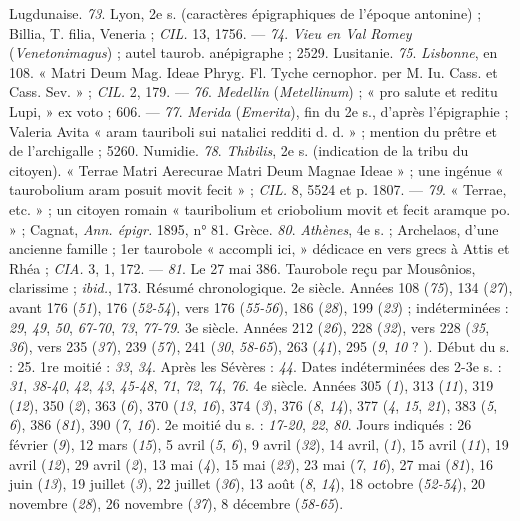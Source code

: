 \documentclass[a4paper, 11pt, oneside, polutonikogreek, french]{article}
\begin{document}
Lugdunaise. \emph{73}. Lyon, 2e s. (caractères épigraphiques de l'époque antonine) ; Billia, T. filia, Veneria ; \emph{CIL.} 13, 1756. --- \emph{74}. \emph{Vieu en Val Romey} (\emph{Venetonimagus}) ; autel taurob. anépigraphe ; 2529.  
Lusitanie. \emph{75}. \emph{Lisbonne}, en 108. « Matri Deum Mag. Ideae Phryg. Fl. Tyche cernophor. per M. Iu. Cass. et Cass. Sev. » ; \emph{CIL.} 2, 179. --- \emph{76}. \emph{Medellin} (\emph{Metellinum}) ; « pro salute et reditu Lupi, » ex voto ; 606. --- \emph{77}. \emph{Merida} (\emph{Emerita}), fin du 2e s., d'après l'épigraphie ; Valeria Avita « aram tauriboli sui natalici redditi d. d. » ; mention du prêtre et de l'archigalle ; 5260.  
Numidie. \emph{78}. \emph{Thibilis}, 2e s. (indication de la tribu du citoyen). « Terrae Matri Aerecurae Matri Deum Magnae Ideae » ; une ingénue « taurobolium aram posuit movit fecit » ; \emph{CIL.} 8, 5524 et p. 1807. --- \emph{79}. « Terrae, etc. » ; un citoyen romain « tauribolium et criobolium movit et fecit aramque po. » ; Cagnat, \emph{Ann. épigr.} 1895, n° 81.  
Grèce. \emph{80}. \emph{Athènes}, 4e s. ; Archelaos, d'une ancienne famille ; 1er taurobole « accompli ici, » dédicace en vers grecs à Attis et Rhéa ; \emph{CIA.} 3, 1, 172. --- \emph{81}. Le 27 mai 386. Taurobole reçu par Mousônios, clarissime ; \emph{ibid.}, 173.  
Résumé chronologique. 2e siècle. Années 108 (\emph{75}), 134 (\emph{27}), avant 176 (\emph{51}), 176 (\emph{52-54}), vers 176 (\emph{55-56}), 186 (\emph{28}), 199 (\emph{23}) ; indéterminées : \emph{29}, \emph{49}, \emph{50}, \emph{67-70}, \emph{73}, \emph{77-79}.  
3e siècle. Années 212 (\emph{26}), 228 (\emph{32}), vers 228 (\emph{35}, \emph{36}), vers 235 (\emph{37}), 239 (\emph{57}), 241 (\emph{30}, \emph{58-65}), 263 (\emph{41}), 295 (\emph{9}, \emph{10} ? ). Début du s. : 25. 1re moitié : \emph{33}, \emph{34}. Après les Sévères : \emph{44}.  
Dates indéterminées des 2-3e s. : \emph{31}, \emph{38-40}, \emph{42}, \emph{43}, \emph{45-48}, \emph{71}, \emph{72}, \emph{74}, \emph{76}.  
4e siècle. Années 305 (\emph{1}), 313 (\emph{11}), 319 (\emph{12}), 350 (\emph{2}), 363 (\emph{6}), 370 (\emph{13}, \emph{16}), 374 (\emph{3}), 376 (\emph{8}, \emph{14}), 377 (\emph{4}, \emph{15}, \emph{21}), 383 (\emph{5}, \emph{6}), 386 (\emph{81}), 390 (\emph{7}, \emph{16}). 2e moitié du s. : \emph{17-20}, \emph{22}, \emph{80}.  
Jours indiqués : 26 février (\emph{9}), 12 mars (\emph{15}), 5 avril (\emph{5}, \emph{6}), 9 avril (\emph{32}), 14 avril, (\emph{1}), 15 avril (\emph{11}), 19 avril (\emph{12}), 29 avril (\emph{2}), 13 mai (\emph{4}), 15 mai (\emph{23}), 23 mai (\emph{7}, \emph{16}), 27 mai (\emph{81}), 16 juin (\emph{13}), 19 juillet (\emph{3}), 22 juillet (\emph{36}), 13 août (\emph{8}, \emph{14}), 18 octobre (\emph{52-54}), 20 novembre (\emph{28}), 26 novembre (\emph{37}), 8 décembre (\emph{58-65}).
\end{document}
